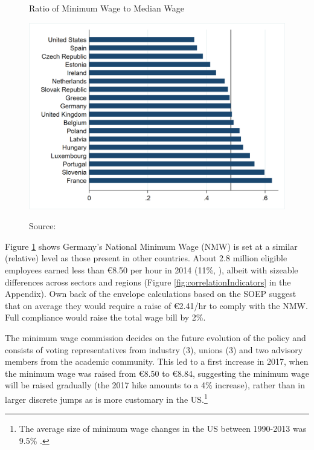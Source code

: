 \begin{figure}[htb]
    \centering
    \caption{Ratio of Minimum Wage to Median Wage}
    \includegraphics[width=0.60\paperwidth]{Images/mwToMedianWage.png}
    \label{fig:mwtomedian}
    \caption*{Source: \citet{OECDmw}}
\end{figure}

Figure \ref{fig:mwtomedian} shows Germany's National Minimum Wage (NMW) is set at a similar (relative) level as those present in other countries. About 2.8 million eligible employees earned less than €8.50 per hour in 2014 (11\%, \citet{Burauel2017}), albeit with sizeable differences across sectors and regions (Figure \ref{fig:correlationIndicators} in the Appendix). Own back of the envelope calculations based on the SOEP suggest that on average they would require a raise of €2.41/hr to comply with the NMW. Full compliance would raise the total wage bill by 2\%.

The minimum wage commission decides on the future evolution of the policy and consists of voting representatives from industry (3), unions (3) and two advisory members from the academic community. This led to a first increase in 2017, when the minimum wage was raised from €8.50 to €8.84, suggesting the minimum wage will be raised gradually (the 2017 hike amounts to a 4\% increase), rather than in larger discrete jumps as is more customary in the US.\footnote{The average size of minimum wage changes in the US between 1990-2013 was 9.5\% \citep{Wursten2017}.}

